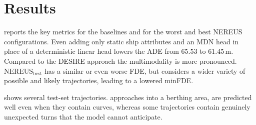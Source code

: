 \documentclass[runningheads]{preamp/llncs}
\begin{document}


\section{Results}
\label{sec:results}


reports the key metrics for the baselines
and for the worst and best \ac{NEREUS} configurations.
Even adding only static ship attributes
and an \ac{MDN} head in place of a deterministic linear head
lowers the \ac{ADE} from $65.53$ to $61.45$\,m.
Compared to the DESIRE approach the multimodality is more pronounced. $\text{NEREUS}_{\text{best}}$ has a similar or even worse FDE, but considers a wider variety of possible and likely trajectories, leading to a lowered minFDE.

 shows several test-set trajectories.
approaches into a berthing area,
are predicted well even when they contain curves,
whereas
some trajectories contain genuinely unexpected turns that the model cannot anticipate.



\end{document}
